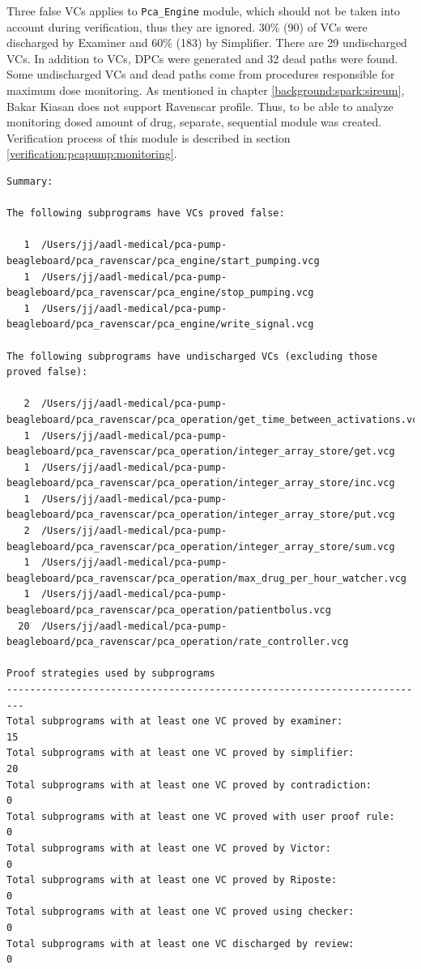Three false VCs applies to \lstinline{Pca_Engine} module, which should not be taken into account during verification, thus they are ignored. 30\% (90) of VCs were discharged by Examiner and 60\% (183) by Simplifier. There are 29 undischarged VCs. In addition to VCs, DPCs were generated and 32 dead paths were found. Some undischarged VCs and dead paths come from procedures responsible for maximum dose monitoring. As mentioned in chapter \ref{background:spark:sireum}, Bakar Kiasan does not support Ravenscar profile. Thus, to be able to analyze monitoring dosed amount of drug, separate, sequential module was created. Verification process of this module is described in section \ref{verification:pcapump:monitoring}.

\singlespacing
\begin{lstlisting}[frame=single, gobble=0, caption={Summary of POGS report for PCA Pump prototype}]
Summary:

The following subprograms have VCs proved false:

   1  /Users/jj/aadl-medical/pca-pump-beagleboard/pca_ravenscar/pca_engine/start_pumping.vcg
   1  /Users/jj/aadl-medical/pca-pump-beagleboard/pca_ravenscar/pca_engine/stop_pumping.vcg
   1  /Users/jj/aadl-medical/pca-pump-beagleboard/pca_ravenscar/pca_engine/write_signal.vcg

The following subprograms have undischarged VCs (excluding those proved false):

   2  /Users/jj/aadl-medical/pca-pump-beagleboard/pca_ravenscar/pca_operation/get_time_between_activations.vcg
   1  /Users/jj/aadl-medical/pca-pump-beagleboard/pca_ravenscar/pca_operation/integer_array_store/get.vcg
   1  /Users/jj/aadl-medical/pca-pump-beagleboard/pca_ravenscar/pca_operation/integer_array_store/inc.vcg
   1  /Users/jj/aadl-medical/pca-pump-beagleboard/pca_ravenscar/pca_operation/integer_array_store/put.vcg
   2  /Users/jj/aadl-medical/pca-pump-beagleboard/pca_ravenscar/pca_operation/integer_array_store/sum.vcg
   1  /Users/jj/aadl-medical/pca-pump-beagleboard/pca_ravenscar/pca_operation/max_drug_per_hour_watcher.vcg
   1  /Users/jj/aadl-medical/pca-pump-beagleboard/pca_ravenscar/pca_operation/patientbolus.vcg
  20  /Users/jj/aadl-medical/pca-pump-beagleboard/pca_ravenscar/pca_operation/rate_controller.vcg

Proof strategies used by subprograms
-------------------------------------------------------------------------
Total subprograms with at least one VC proved by examiner:             15
Total subprograms with at least one VC proved by simplifier:           20
Total subprograms with at least one VC proved by contradiction:         0
Total subprograms with at least one VC proved with user proof rule:     0
Total subprograms with at least one VC proved by Victor:                0
Total subprograms with at least one VC proved by Riposte:               0
Total subprograms with at least one VC proved using checker:            0
Total subprograms with at least one VC discharged by review:            0


\end{lstlisting}

